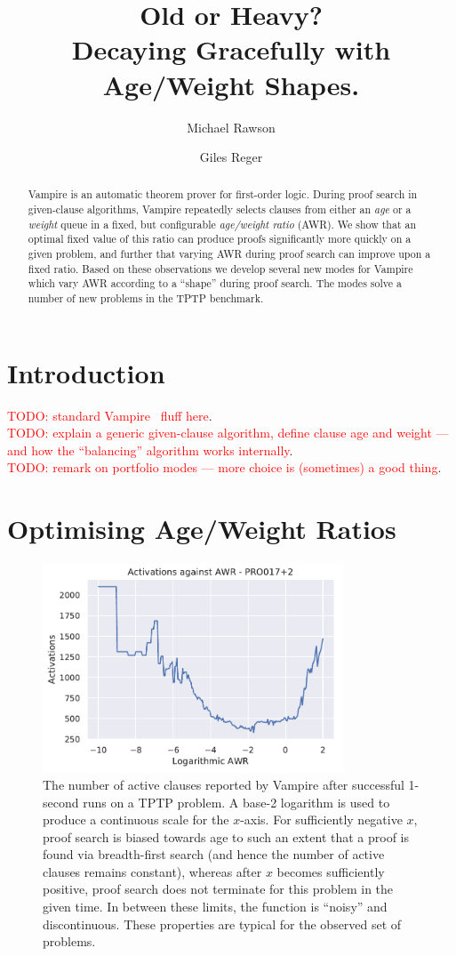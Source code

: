 \documentclass{llncs}
\title{Old or Heavy?\\Decaying Gracefully with Age/Weight Shapes.}
\author{Michael Rawson \and Giles Reger}
\institute{University of Manchester, Manchester, UK}
\newcommand{\todo}[1]{\textcolor{red}{TODO: #1}}
\begin{document}
\maketitle
\begin{abstract}
Vampire is an automatic theorem prover for first-order logic.
During proof search in given-clause algorithms, Vampire repeatedly selects clauses from either an \emph{age} or a \emph{weight} queue in a fixed, but configurable \emph{age/weight ratio} (AWR).
We show that an optimal fixed value of this ratio can produce proofs significantly more quickly on a given problem, and further that varying AWR during proof search can improve upon a fixed ratio.
Based on these observations we develop several new modes for Vampire which vary AWR according to a ``shape'' during proof search.
The modes solve a number of new problems in the TPTP benchmark.
\end{abstract}

\section{Introduction}
\label{sec:introduction}
\todo{standard Vampire~\cite{vampire} fluff here}.\\
\todo{explain a generic given-clause algorithm, define clause age and weight --- and how the ``balancing'' algorithm works internally}.\\
\todo{remark on portfolio modes --- more choice is (sometimes) a good thing}.

\section{Optimising Age/Weight Ratios}
\begin{figure}
	\centering
	\includegraphics[width=0.8\textwidth]{example-optimal-awr}
	\caption{
The number of active clauses reported by Vampire after successful 1-second runs on a TPTP problem.
A base-2 logarithm is used to produce a continuous scale for the \(x\)-axis.
For sufficiently negative \(x\), proof search is biased towards age to such an extent that a proof is found via breadth-first search (and hence the number of active clauses remains constant), whereas after \(x\) becomes sufficiently positive, proof search does not terminate for this problem in the given time.
In between these limits, the function is ``noisy'' and discontinuous.
These properties are typical for the observed set of problems.
}
	\label{fig:example-optimal-awr}
\end{figure}
\end{document}
